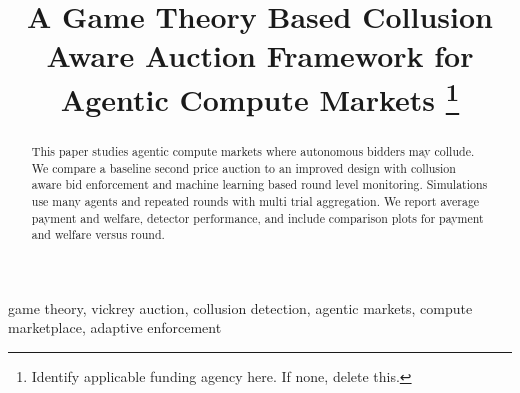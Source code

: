 \documentclass[conference]{IEEEtran}
\begin{document}
\title{A Game Theory Based Collusion Aware Auction Framework for Agentic Compute Markets
\thanks{Identify applicable funding agency here. If none, delete this.}
}

\author{
\and
{}
\and
{}
\and
{}
}

\maketitle

\begin{abstract}
This paper studies agentic compute markets where autonomous bidders may collude. We compare a baseline second price auction to an improved design with collusion aware bid enforcement and machine learning based round level monitoring. Simulations use many agents and repeated rounds with multi trial aggregation. We report average payment and welfare, detector performance, and include comparison plots for payment and welfare versus round.
\end{abstract}

\begin{IEEEkeywords}
game theory, vickrey auction, collusion detection, agentic markets, compute marketplace, adaptive enforcement
\end{IEEEkeywords}
\end{document}
